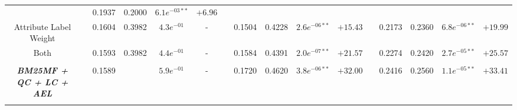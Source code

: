 \begin{table*}
{\begin{tabular}{cc@{\hs}rrccc@{\hs}rrccc@{\hs}rrcc}
                                   & \phantom{a} & 0.1937 & 0.2000 & $6.1e^{-03**}$ & $+6.96$ \\
{\raggedright Attribute Label Weight} & \phantom{a} & 0.1604 & 0.3982 & $4.3e^{-01}$ & -
                                      & \phantom{a} & 0.1504 & 0.4228 & $2.6e^{-06**}$ & $+15.43$
                                      & \phantom{a} & 0.2173 & 0.2360 & $6.8e^{-06**}$ & $+19.99$ \\
{\raggedright Both} & \phantom{a} & 0.1593 & 0.3982 & $4.4e^{-01}$ & -
                    & \phantom{a} & 0.1584 & 0.4391 & $2.0e^{-07**}$ & $+21.57$
                    & \phantom{a} & 0.2274 & 0.2420 & $2.7e^{-05**}$ & $+25.57$ \\
\\
\emph{\textbf{BM25MF + QC + LC + AEL}} & \phantom{a} & 0.1589 &  & $5.9e^{-01}$ & -
                                       & \phantom{a} & 0.1720 & 0.4620 & $3.8e^{-06**}$ & $+32.00$
                                       & \phantom{a} & 0.2416 & 0.2560 & $1.1e^{-05**}$ & $+33.41$ \\
\midrule
\\[-0.2cm]


\end{tabular}}
\end{table*}
